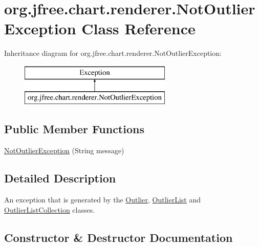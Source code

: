 \hypertarget{classorg_1_1jfree_1_1chart_1_1renderer_1_1_not_outlier_exception}{}\section{org.\+jfree.\+chart.\+renderer.\+Not\+Outlier\+Exception Class Reference}
\label{classorg_1_1jfree_1_1chart_1_1renderer_1_1_not_outlier_exception}
Inheritance diagram for org.\+jfree.\+chart.\+renderer.\+Not\+Outlier\+Exception\+:\begin{figure}[H]
\begin{center}
\leavevmode
\includegraphics[height=2.000000cm]{classorg_1_1jfree_1_1chart_1_1renderer_1_1_not_outlier_exception}
\end{center}
\end{figure}
\subsection*{Public Member Functions}
\begin{DoxyCompactItemize}
\item 
\mbox{\hyperlink{classorg_1_1jfree_1_1chart_1_1renderer_1_1_not_outlier_exception_a277a79c5cc2259c3886117cd070053b8}{Not\+Outlier\+Exception}} (String message)
\end{DoxyCompactItemize}


\subsection{Detailed Description}
An exception that is generated by the \mbox{\hyperlink{classorg_1_1jfree_1_1chart_1_1renderer_1_1_outlier}{Outlier}}, \mbox{\hyperlink{classorg_1_1jfree_1_1chart_1_1renderer_1_1_outlier_list}{Outlier\+List}} and \mbox{\hyperlink{classorg_1_1jfree_1_1chart_1_1renderer_1_1_outlier_list_collection}{Outlier\+List\+Collection}} classes. 

\subsection{Constructor \& Destructor Documentation}
\mbox{\label{classorg_1_1jfree_1_1chart_1_1renderer_1_1_not_outlier_exception_a277a79c5cc2259c3886117cd070053b8}} 
